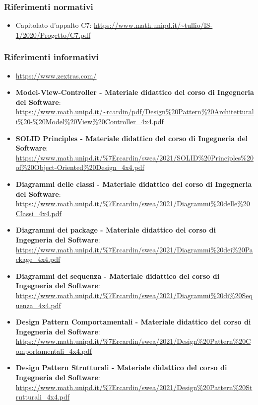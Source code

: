 \subsubsection{Riferimenti normativi}
\begin{itemize}
\item Capitolato d'appalto C7: \newline{} \url{https://www.math.unipd.it/~tullio/IS-1/2020/Progetto/C7.pdf}
\end{itemize}

\subsubsection{Riferimenti informativi}

\begin{itemize}
	\item \url{https://www.zextras.com/}
	
	\item \textbf{Model-View-Controller - Materiale didattico del corso di Ingegneria del Software}: \newline{}
	\url{https://www.math.unipd.it/~rcardin/pdf/Design\%20Pattern\%20Architetturali\%20-\%20Model\%20View\%20Controller_4x4.pdf}
	\item \textbf{SOLID Principles - Materiale didattico del corso di Ingegneria del Software}: \newline{}
	\url{https://www.math.unipd.it/\%7Ercardin/swea/2021/SOLID\%20Principles\%20of\%20Object-Oriented\%20Design_4x4.pdf}
	\item \textbf{Diagrammi delle classi - Materiale didattico del corso di Ingegneria del Software}: \newline{}
	\url{https://www.math.unipd.it/\%7Ercardin/swea/2021/Diagrammi\%20delle\%20Classi_4x4.pdf}
	\item \textbf{Diagrammi dei package - Materiale didattico del corso di Ingegneria del Software}: \newline{}
	\url{https://www.math.unipd.it/\%7Ercardin/swea/2021/Diagrammi\%20dei\%20Package_4x4.pdf}
	\item \textbf{Diagrammi dei sequenza - Materiale didattico del corso di Ingegneria del Software}: \newline{}
	\url{https://www.math.unipd.it/\%7Ercardin/swea/2021/Diagrammi\%20di\%20Sequenza_4x4.pdf}
	\item \textbf{Design Pattern Comportamentali - Materiale didattico del corso di Ingegneria del Software}: \newline{} \url{https://www.math.unipd.it/\%7Ercardin/swea/2021/Design\%20Pattern\%20Comportamentali_4x4.pdf}
	\item \textbf{Design Pattern Strutturali - Materiale didattico del corso di Ingegneria del Software}: \newline{}
	\url{https://www.math.unipd.it/\%7Ercardin/swea/2021/Design\%20Pattern\%20Strutturali_4x4.pdf}
	
	
\end{itemize}


